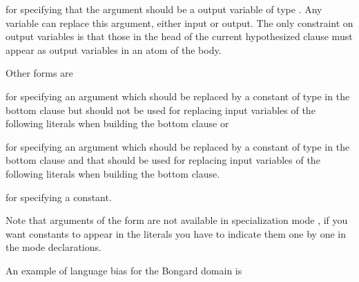 \documentclass[letterpaper,10pt,english]{sphinxmanual}
\begin{document}
for specifying that the argument should be a output variable of type .
Any variable can replace this argument, either input or output.
The only constraint on output variables is that those in the head of the current hypothesized clause must appear as output variables in an atom of the body.

Other forms are

\begin{sphinxVerbatim}[commandchars=\\\{\}]
\end{sphinxVerbatim}

for specifying an argument which should be replaced by a constant of type  in the bottom clause but should not be used for replacing input variables of the following literals when building the bottom clause or

\begin{sphinxVerbatim}[commandchars=\\\{\}]
\end{sphinxVerbatim}

for specifying an argument which should be replaced by a constant of type  in the bottom clause and that should be used for replacing input variables of the following literals when building the bottom clause.

\begin{sphinxVerbatim}[commandchars=\\\{\}]
\end{sphinxVerbatim}

for specifying a constant.

Note that arguments of the form   are not available in specialization mode , if you want constants to appear in the literals you have to indicate them one by one in the mode declarations.

An example of language bias for the Bongard domain is
\end{document}
